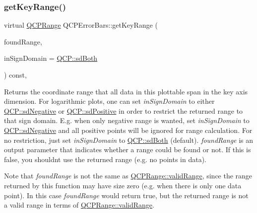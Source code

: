 \mbox{\label{class_q_c_p_error_bars_aa8850872dd67af338e612427ec595a13}} 
\subsubsection{\texorpdfstring{get\+Key\+Range()}{getKeyRange()}\hspace{0.1cm}{\footnotesize\ttfamily [1/2]}}
{\footnotesize\ttfamily virtual \hyperlink{class_q_c_p_range}{Q\+C\+P\+Range} Q\+C\+P\+Error\+Bars\+::get\+Key\+Range (\begin{DoxyParamCaption}\item[{bool \&}]{found\+Range,  }\item[{\hyperlink{namespace_q_c_p_afd50e7cf431af385614987d8553ff8a9}{Q\+C\+P\+::\+Sign\+Domain}}]{in\+Sign\+Domain = {\ttfamily \hyperlink{namespace_q_c_p_afd50e7cf431af385614987d8553ff8a9a3dee7e9cd2fedce9253b83e172626a6c}{Q\+C\+P\+::sd\+Both}} }\end{DoxyParamCaption}) const\hspace{0.3cm}{\ttfamily [protected]}, {\ttfamily [virtual]}}

Returns the coordinate range that all data in this plottable span in the key axis dimension. For logarithmic plots, one can set {\itshape in\+Sign\+Domain} to either \hyperlink{namespace_q_c_p_afd50e7cf431af385614987d8553ff8a9a0b464fa3135be2808909739a969193c9}{Q\+C\+P\+::sd\+Negative} or \hyperlink{namespace_q_c_p_afd50e7cf431af385614987d8553ff8a9a23362334a52289677a51526a9b68db6c}{Q\+C\+P\+::sd\+Positive} in order to restrict the returned range to that sign domain. E.\+g. when only negative range is wanted, set {\itshape in\+Sign\+Domain} to \hyperlink{namespace_q_c_p_afd50e7cf431af385614987d8553ff8a9a0b464fa3135be2808909739a969193c9}{Q\+C\+P\+::sd\+Negative} and all positive points will be ignored for range calculation. For no restriction, just set {\itshape in\+Sign\+Domain} to \hyperlink{namespace_q_c_p_afd50e7cf431af385614987d8553ff8a9a3dee7e9cd2fedce9253b83e172626a6c}{Q\+C\+P\+::sd\+Both} (default). {\itshape found\+Range} is an output parameter that indicates whether a range could be found or not. If this is false, you shouldn\textquotesingle{}t use the returned range (e.\+g. no points in data).

Note that {\itshape found\+Range} is not the same as \hyperlink{class_q_c_p_range_ab38bd4841c77c7bb86c9eea0f142dcc0}{Q\+C\+P\+Range\+::valid\+Range}, since the range returned by this function may have size zero (e.\+g. when there is only one data point). In this case {\itshape found\+Range} would return true, but the returned range is not a valid range in terms of \hyperlink{class_q_c_p_range_ab38bd4841c77c7bb86c9eea0f142dcc0}{Q\+C\+P\+Range\+::valid\+Range}.

